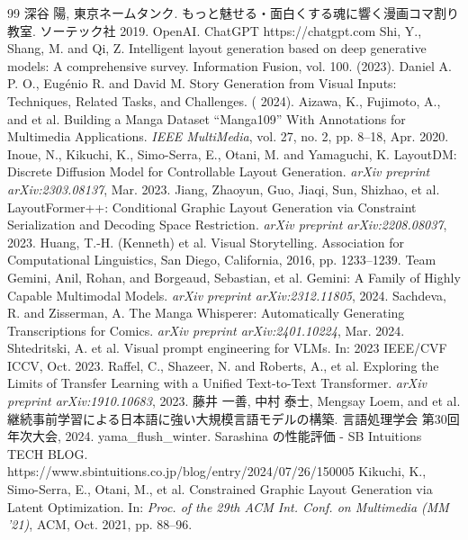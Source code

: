 % 
% 
{\footnotesize
\begin{thebibliography}{99}
 深谷 陽, 東京ネームタンク. もっと魅せる・面白くする魂に響く漫画コマ割り教室. ソーテック社 2019. 
OpenAI. ChatGPT https://chatgpt.com 
Shi, Y., Shang, M. and Qi, Z. Intelligent layout generation based on deep generative models: A comprehensive survey. Information Fusion, vol. 100. (2023). 
Daniel A. P. O., Eugénio R. and David M. Story Generation from Visual Inputs: Techniques, Related Tasks, and Challenges. ( 2024).
Aizawa, K., Fujimoto, A., and et al. Building a Manga Dataset “Manga109” With Annotations for Multimedia Applications. \emph{IEEE MultiMedia}, vol. 27, no. 2, pp. 8--18, Apr. 2020.
Inoue, N., Kikuchi, K., Simo-Serra, E., Otani, M. and Yamaguchi, K. LayoutDM: Discrete Diffusion Model for Controllable Layout Generation. \emph{arXiv preprint arXiv:2303.08137}, Mar. 2023. 
Jiang, Zhaoyun, Guo, Jiaqi, Sun, Shizhao, et al. LayoutFormer++: Conditional Graphic Layout Generation via Constraint Serialization and Decoding Space Restriction. \emph{arXiv preprint arXiv:2208.08037}, 2023.
Huang, T.-H. (Kenneth) et al. Visual Storytelling. Association for Computational Linguistics, San Diego, California, 2016, pp. 1233--1239.
Team Gemini, Anil, Rohan, and Borgeaud, Sebastian, et al. Gemini: A Family of Highly Capable Multimodal Models. \emph{arXiv preprint arXiv:2312.11805}, 2024.
Sachdeva, R. and Zisserman, A. The Manga Whisperer: Automatically Generating Transcriptions for Comics. \emph{arXiv preprint arXiv:2401.10224}, Mar. 2024.
Shtedritski, A. et al. Visual prompt engineering for VLMs. In: 2023 IEEE/CVF ICCV, Oct. 2023.
Raffel, C., Shazeer, N. and Roberts, A., et al. Exploring the Limits of Transfer Learning with a Unified Text-to-Text Transformer. \emph{arXiv preprint arXiv:1910.10683}, 2023.
藤井 一善, 中村 泰士, Mengsay Loem, and et al. 継続事前学習による日本語に強い大規模言語モデルの構築. 言語処理学会 第30回年次大会, 2024.
yama\_flush\_winter. Sarashina の性能評価 - SB Intuitions TECH BLOG. \\https://www.sbintuitions.co.jp/blog/entry/2024/07/26/150005 
Kikuchi, K., Simo-Serra, E., Otani, M., et al. Constrained Graphic Layout Generation via Latent Optimization. In: \emph{Proc. of the 29th ACM Int. Conf. on Multimedia (MM ’21)}, ACM, Oct. 2021, pp. 88–96.
\end{thebibliography}
}
%
